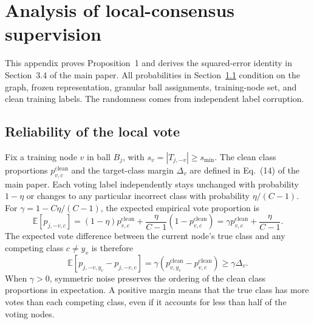 \FloatBarrier
\setcounter{table}{0}
\section{Analysis of local-consensus supervision}\label{sec:H}
\setcounter{equation}{0}
\renewcommand{\theequation}{H.\arabic{equation}}
\renewcommand{\theHequation}{H.\arabic{equation}}

This appendix proves Proposition~1 and derives the squared-error identity in Section~3.4 of the main paper. All probabilities in Section~\ref{sec:H.1} condition on the graph, frozen representation, granular ball assignments, training-node set, and clean training labels. The randomness comes from independent label corruption.

\subsection{Reliability of the local vote}\label{sec:H.1}

Fix a training node \(v\) in ball \(B_j\), with \(s_v=|T_{j,-v}|\geq s_{\min}\). The clean class proportions \(p^{\mathrm{clean}}_{v,c}\) and the target-class margin \(\Delta_v\) are defined in Eq.~(14) of the main paper. Each voting label independently stays unchanged with probability \(1-\eta\) or changes to any particular incorrect class with probability \(\eta/(C-1)\). For \(\gamma=1-C\eta/(C-1)\), the expected empirical vote proportion is
\begin{equation}\label{eq:H.1}
\mathbb{E}[p_{j,-v,c}]=(1-\eta)p^{\mathrm{clean}}_{v,c}
+\frac{\eta}{C-1}(1-p^{\mathrm{clean}}_{v,c})
=\gamma p^{\mathrm{clean}}_{v,c}+\frac{\eta}{C-1}.
\end{equation}
The expected vote difference between the current node's true class and any competing class \(c\ne y_v\) is therefore
\begin{equation}\label{eq:H.2}
\mathbb{E}[p_{j,-v,y_v}-p_{j,-v,c}]
=\gamma(p^{\mathrm{clean}}_{v,y_v}-p^{\mathrm{clean}}_{v,c})\geq\gamma\Delta_v.
\end{equation}
When \(\gamma>0\), symmetric noise preserves the ordering of the clean class proportions in expectation. A positive margin means that the true class has more votes than each competing class, even if it accounts for less than half of the voting nodes.

